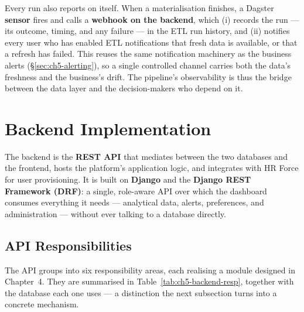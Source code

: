 Every run also reports on itself. When a materialisation finishes, a Dagster \textbf{sensor} fires and
calls a \textbf{webhook on the backend}, which (i) records the run --- its outcome, timing, and any
failure --- in the ETL run history, and (ii) notifies every user who has enabled ETL notifications that
fresh data is available, or that a refresh has failed. This reuses the same notification machinery as the
business alerts (\S\ref{sec:ch5-alerting}), so a single controlled channel carries both the data's
freshness and the business's drift. The pipeline's observability is thus the bridge between the data
layer and the decision-makers who depend on it.

\section{Backend Implementation}
\label{sec:ch5-backend}

The backend is the \textbf{REST API} that mediates between the two databases and the frontend, hosts the
platform's application logic, and integrates with HR Force for user provisioning. It is built on
\textbf{Django} and the \textbf{Django REST Framework (DRF)}: a single, role-aware API over which the
dashboard consumes everything it needs --- analytical data, alerts, preferences, and administration ---
without ever talking to a database directly.

\subsection{API Responsibilities}

The API groups into six responsibility areas, each realising a module designed in Chapter~4. They are
summarised in Table~\ref{tab:ch5-backend-resp}, together with the database each one uses --- a
distinction the next subsection turns into a concrete mechanism.

